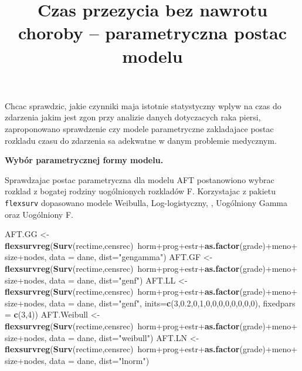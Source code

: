 \documentclass[]{article}
\title{Czas przezycia bez nawrotu choroby -- parametryczna postac modelu}
\author{}
\date{}
\newenvironment{Shaded}{}{}
\newcommand{\KeywordTok}[1]{\textcolor[rgb]{0.00,0.44,0.13}{\textbf{{#1}}}}
\newcommand{\DataTypeTok}[1]{\textcolor[rgb]{0.56,0.13,0.00}{{#1}}}
\newcommand{\DecValTok}[1]{\textcolor[rgb]{0.25,0.63,0.44}{{#1}}}
\newcommand{\FloatTok}[1]{\textcolor[rgb]{0.25,0.63,0.44}{{#1}}}
\newcommand{\StringTok}[1]{\textcolor[rgb]{0.25,0.44,0.63}{{#1}}}
\newcommand{\NormalTok}[1]{{#1}}
\begin{document}
\maketitle


\thispagestyle{fancy}

Chcac sprawdzic, jakie czynniki maja istotnie statystyczny wplyw na czas
do zdarzenia jakim jest zgon przy analizie danych dotyczacych raka
piersi, zaproponowano sprawdzenie czy modele parametryczne zakladajace
postac rozkladu czasu do zdarzenia sa adekwatne w danym problemie
medycznym.

\textbf{Wybór parametrycznej formy modelu.}

Sprawdzajac postac parametryczna dla modelu AFT postanowiono wybrac
rozklad z bogatej rodziny uogólnionych rozkladów F. Korzystajac z
pakietu \texttt{flexsurv} dopasowano modele Weibulla, Log-logistyczny,
, Uogólniony Gamma oraz Uogólniony F.

\begin{Shaded}
\begin{Highlighting}[]
\NormalTok{AFT.GG <-}\StringTok{ }\KeywordTok{flexsurvreg}\NormalTok{(}\KeywordTok{Surv}\NormalTok{(rectime,censrec)~horm+prog+estr+}\KeywordTok{as.factor}\NormalTok{(grade)+meno+size+nodes, }
                             \DataTypeTok{data =} \NormalTok{dane, }\DataTypeTok{dist=}\StringTok{"gengamma"}\NormalTok{)}
\NormalTok{AFT.GF <-}\StringTok{ }\KeywordTok{flexsurvreg}\NormalTok{(}\KeywordTok{Surv}\NormalTok{(rectime,censrec)~horm+prog+estr+}\KeywordTok{as.factor}\NormalTok{(grade)+meno+size+nodes, }
                             \DataTypeTok{data =} \NormalTok{dane, }\DataTypeTok{dist=}\StringTok{"genf"}\NormalTok{)}
\NormalTok{AFT.LL <-}\StringTok{ }\KeywordTok{flexsurvreg}\NormalTok{(}\KeywordTok{Surv}\NormalTok{(rectime,censrec)~horm+prog+estr+}\KeywordTok{as.factor}\NormalTok{(grade)+meno+size+nodes, }
                             \DataTypeTok{data =} \NormalTok{dane, }\DataTypeTok{dist=}\StringTok{"genf"}\NormalTok{, }\DataTypeTok{inits=}\KeywordTok{c}\NormalTok{(}\DecValTok{3}\NormalTok{,}\FloatTok{0.2}\NormalTok{,}\DecValTok{0}\NormalTok{,}\DecValTok{1}\NormalTok{,}\DecValTok{0}\NormalTok{,}\DecValTok{0}\NormalTok{,}\DecValTok{0}\NormalTok{,}\DecValTok{0}\NormalTok{,}\DecValTok{0}\NormalTok{,}\DecValTok{0}\NormalTok{,}\DecValTok{0}\NormalTok{,}\DecValTok{0}\NormalTok{), }
                             \DataTypeTok{fixedpars =} \KeywordTok{c}\NormalTok{(}\DecValTok{3}\NormalTok{,}\DecValTok{4}\NormalTok{))}
\NormalTok{AFT.Weibull <-}\StringTok{ }\KeywordTok{flexsurvreg}\NormalTok{(}\KeywordTok{Surv}\NormalTok{(rectime,censrec)~horm+prog+estr+}\KeywordTok{as.factor}\NormalTok{(grade)+meno+}
\StringTok{                             }\NormalTok{size+nodes,}
                             \DataTypeTok{data =} \NormalTok{dane, }\DataTypeTok{dist=}\StringTok{"weibull"}\NormalTok{)}
\NormalTok{AFT.LN <-}\StringTok{ }\KeywordTok{flexsurvreg}\NormalTok{(}\KeywordTok{Surv}\NormalTok{(rectime,censrec)~horm+prog+estr+}\KeywordTok{as.factor}\NormalTok{(grade)+meno+size+nodes, }
                             \DataTypeTok{data =} \NormalTok{dane, }\DataTypeTok{dist=}\StringTok{"lnorm"}\NormalTok{)}
\end{Highlighting}
\end{Shaded}
\end{document}

